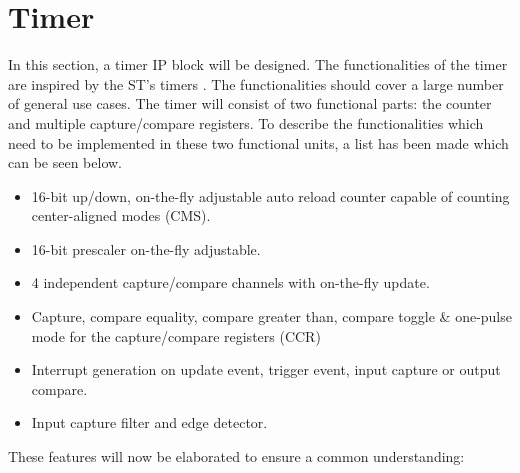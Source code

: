 \documentclass[./dissertation.tex]{subfiles}
\begin{document}
 


  \section{Timer}

\label{timer_sec}
In this section, a timer IP block will be designed. The functionalities of the timer are inspired by the ST's timers \cite{TimerManualSTM}. The functionalities should cover a large number of general use cases. The timer will consist of two functional parts: the counter and multiple capture/compare registers. To describe the functionalities which need to be implemented in these two functional units, a list has been made which can be seen below.

\begin{itemize}
    \item 16-bit up/down, on-the-fly adjustable auto reload counter capable of counting center-aligned modes (CMS).
    \item 16-bit prescaler on-the-fly adjustable.
    \item 4 independent capture/compare channels with on-the-fly update.
    \item Capture, compare equality, compare greater than, compare toggle \& one-pulse mode for the capture/compare registers (CCR)
    \item Interrupt generation on update event, trigger event, input capture or output compare.
    \item Input capture filter and edge detector.
\end{itemize}

These features will now be elaborated to ensure a common understanding:
\end{document}
